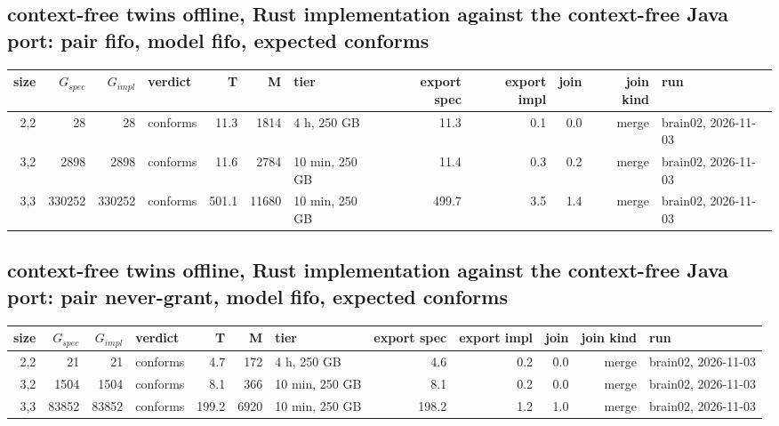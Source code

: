 \documentclass[10pt]{article}
\begin{document}
\subsection*{context-free twins offline, Rust implementation against the context-free Java port: pair \textsf{fifo}, model fifo, expected conforms}
\begin{longtable}{@{}rrrlrrlrrrrl@{}}
\toprule
size & $G_{\mathit{spec}}$ & $G_{\mathit{impl}}$ & verdict & T & M & tier & export spec & export impl & join & join kind & run \\
\midrule
\endhead
\color{blue} 2,2 & 28 & 28 & conforms & 11.3 & 1814 & 4 h, 250 GB & 11.3 & 0.1 & 0.0 & merge & brain02, 2026-11-03 \\
\color{blue} 3,2 & 2898 & 2898 & conforms & 11.6 & 2784 & 10 min, 250 GB & 11.4 & 0.3 & 0.2 & merge & brain02, 2026-11-03 \\
\color{blue} 3,3 & 330252 & 330252 & conforms & 501.1 & 11680 & 10 min, 250 GB & 499.7 & 3.5 & 1.4 & merge & brain02, 2026-11-03 \\
\bottomrule
\end{longtable}
\subsection*{context-free twins offline, Rust implementation against the context-free Java port: pair \textsf{never-grant}, model fifo, expected conforms}
\begin{longtable}{@{}rrrlrrlrrrrl@{}}
\toprule
size & $G_{\mathit{spec}}$ & $G_{\mathit{impl}}$ & verdict & T & M & tier & export spec & export impl & join & join kind & run \\
\midrule
\endhead
\color{blue} 2,2 & 21 & 21 & conforms & 4.7 & 172 & 4 h, 250 GB & 4.6 & 0.2 & 0.0 & merge & brain02, 2026-11-03 \\
\color{blue} 3,2 & 1504 & 1504 & conforms & 8.1 & 366 & 10 min, 250 GB & 8.1 & 0.2 & 0.0 & merge & brain02, 2026-11-03 \\
\color{blue} 3,3 & 83852 & 83852 & conforms & 199.2 & 6920 & 10 min, 250 GB & 198.2 & 1.2 & 1.0 & merge & brain02, 2026-11-03 \\
\bottomrule
\end{longtable}
\end{document}
